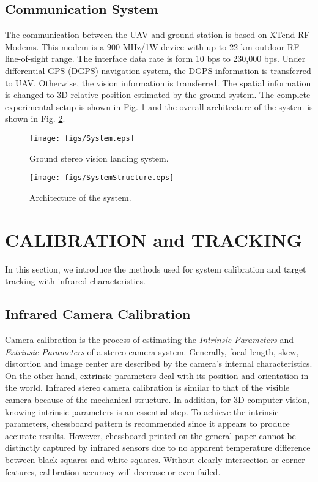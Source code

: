 \documentclass[letterpaper, 10 pt, conference]{ieeeconf}  %
\begin{document}
\subsection{Communication System}
The communication between the UAV and ground station is based on XTend RF Modems. This modem is a 900 MHz/1W device with up to 22 km outdoor RF line-of-sight range. The interface data rate is form 10 bps to 230,000 bps. Under differential GPS (DGPS) navigation system, the DGPS information is transferred to UAV. Otherwise, the vision information is transferred. The spatial information is changed to 3D relative position estimated by the ground system. The complete experimental setup is shown in Fig. \ref{fig:system} and the overall architecture of the system is shown in Fig. \ref{fig:SystemStructure}.
   \begin{figure}[!tb]
      \centering
      \texttt{[image: figs/System.eps]}
      \caption{Ground stereo vision landing system.}
      \label{fig:system}
   \end{figure}
   \begin{figure}[!tb]
      \centering
      \texttt{[image: figs/SystemStructure.eps]}
      \caption{Architecture of the system.}
      \label{fig:SystemStructure}
   \end{figure}

\section{CALIBRATION and TRACKING}
In this section, we introduce the methods used for system calibration and target tracking with infrared characteristics.

\subsection{Infrared Camera Calibration}
Camera calibration is the process of estimating the {\it  Intrinsic Parameters} and {\it Extrinsic Parameters} of a stereo camera system. Generally, focal length, skew, distortion and image center are described by the camera's internal characteristics. On the other hand, extrinsic parameters deal with its position and orientation in the world. Infrared stereo camera calibration is similar to that of the visible camera because of the mechanical structure. In addition, for 3D computer vision, knowing intrinsic parameters is an essential step. To achieve the intrinsic parameters, chessboard pattern is recommended since it appears to produce accurate results. However, chessboard printed on the general paper cannot be distinctly captured by infrared sensors due to no apparent temperature difference between black squares and white squares. Without clearly intersection or corner features, calibration accuracy will decrease or even failed.
\end{document}
